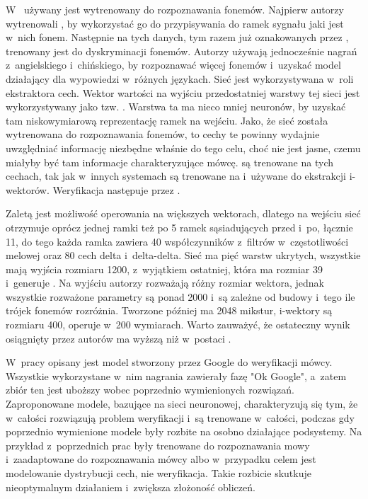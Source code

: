 W~\cite{investigationOfBottleneck}
używany jest  wytrenowany do rozpoznawania fonemów. Najpierw autorzy wytrenowali
, by wykorzystać go do przypisywania do ramek sygnału jaki
jest w~nich fonem. Następnie na tych danych, tym razem już oznakowanych przez ,
trenowany jest  do dyskryminacji fonemów. Autorzy używają
jednocześnie nagrań z~angielskiego i~chińskiego, by rozpoznawać więcej fonemów i~uzyskać model działający
dla wypowiedzi w~różnych językach.
Sieć jest wykorzystywana w~roli ekstraktora cech. Wektor wartości na wyjściu przedostatniej warstwy
tej sieci jest wykorzystywany jako tzw. .
Warstwa ta ma nieco mniej neuronów, by uzyskać tam niskowymiarową reprezentację ramek na wejściu.
Jako, że sieć została wytrenowana do rozpoznawania fonemów, to cechy te powinny
wydajnie uwzględniać informację niezbędne właśnie do tego celu, choć nie jest jasne, czemu miałyby być
tam informacje charakteryzujące mówcę.
 są trenowane na tych cechach, tak jak w~innych systemach są trenowane na 
i~używane do ekstrakcji i-wektorów. Weryfikacja następuje przez .

Zaletą  jest możliwość operowania na większych wektorach, dlatego na wejściu sieć otrzymuje
oprócz jednej ramki też po 5 ramek sąsiadujących przed i~po, łącznie 11,
do tego każda ramka zawiera 40 współczynników z~filtrów w~częstotliwości melowej oraz 80 cech delta i~delta-delta.
Sieć ma pięć warstw ukrytych, wszystkie mają wyjścia rozmiaru 1200, z~wyjątkiem
ostatniej, która ma rozmiar 39 i~generuje . Na wyjściu autorzy rozważają
różny rozmiar wektora, jednak wszystkie rozważone parametry są ponad 2000 i~są zależne
od budowy  i~tego ile trójek fonemów rozróżnia. Tworzone później
 ma 2048 mikstur, i-wektory są rozmiaru 400,  operuje w~200 wymiarach.
Warto zauważyć, że ostateczny wynik osiągnięty przez autorów ma wyższą  niż 
w~postaci .

W~pracy \cite{endToEnd} opisany jest model stworzony przez Google do weryfikacji mówcy. Wszystkie wykorzystane
w~nim nagrania zawierały fazę "Ok Google", a~zatem zbiór ten jest uboższy wobec poprzednio wymienionych rozwiązań.
Zaproponowane modele, bazujące na sieci neuronowej, charakteryzują się tym, że w~całości rozwiązują problem weryfikacji
i~są trenowane w~całości, podczas gdy poprzednio wymienione modele były rozbite na osobno działające podsystemy.
Na przykład  z~poprzednich prac były trenowane do rozpoznawania mowy i~zaadaptowane do rozpoznawania
mówcy albo w~przypadku  celem jest modelowanie dystrybucji cech, nie weryfikacja. Takie rozbicie
skutkuje nieoptymalnym działaniem i~zwiększa złożoność obliczeń.


